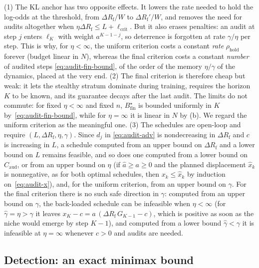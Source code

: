 \begin{remark}\label{rem:audit-criteria}
(1) The KL anchor has two opposite effects. It lowers the rate needed to hold
the log-odds at the threshold, from $\Delta R_{\mathrm f}/W$ to $\Delta R_{\mathrm f}'/W$, and removes
the need for audits altogether when $\eta\Delta R_{\mathrm f}\le L+\ell_{\mathrm{crit}}$.
But it also erases penalties: an audit at step $j$ enters $\ell_K$ with weight
$a^{K-1-j}$, so deterrence is forgotten at rate $\gamma/\eta$ per step. This is
why, for $\eta<\infty$, the uniform criterion costs a constant \emph{rate}
$\rho_{\mathrm{hold}}$ forever (budget linear in $N$), whereas the final
criterion costs a constant \emph{number} of audited steps
\eqref{eq:audit-fin-bound}, of the order of the memory $\eta/\gamma$ of the
dynamics, placed at the very end. (2) The final criterion is therefore cheap
but weak: it lets the stealthy stratum dominate during training, requires the
horizon $K$ to be known, and its guarantee decays after the last audit. The
limits do not commute: for fixed $\eta<\infty$ and fixed $n$, $B^\star_{\mathrm{fin}}$ is bounded uniformly in $K$ by~\eqref{eq:audit-fin-bound}, while for $\eta=\infty$ it is linear in $N$ by (b). We regard the
uniform criterion as the meaningful one. (3) The schedules are open-loop and
require $(L,\Delta R_{\mathrm f},\eta,\gamma)$. Since $d_j$ in \eqref{eq:audit-adv} is
nondecreasing in $\Delta R_{\mathrm f}$ and $c$ is increasing in $L$, a schedule computed
from an upper bound on $\Delta R_{\mathrm f}$ and a lower bound on $L$ remains feasible, and so does one computed from a lower bound on $C_{\mathrm{aud}}$, or from an upper bound on $\eta$ (if $\hat a\ge a\ge0$ and the planned displacement $\hat x_k$ is nonnegative, as for both optimal schedules, then $x_k\le\hat x_k$ by induction on~\eqref{eq:audit-x}), and, for the uniform criterion, from an upper bound on $\gamma$. For the final criterion there is no such safe direction in $\gamma$: computed from an upper bound on $\gamma$, the back-loaded schedule can be infeasible when $\eta<\infty$ (for $\hat\gamma=\eta>\gamma$ it leaves $x_K-c=a\,(\Delta R_{\mathrm f}\,G_{K-1}-c)$, which is positive as soon as the niche would emerge by step $K-1$), and computed from a lower bound $\hat\gamma<\gamma$ it is infeasible at $\eta=\infty$ whenever $c>0$ and audits are needed.
\end{remark}

\subsection{Detection: an exact minimax bound}

